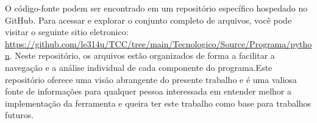 O código-fonte podem ser encontrado em um repositório específico hospedado no GitHub. Para acessar e explorar o conjunto completo de arquivos, você pode visitar o seguinte sitio eletronico: \url{https://github.com/le314u/TCC/tree/main/Tecnologico/Source/Programa/python}. Neste repositório, os arquivos estão organizados de forma a facilitar a navegação e a análise individual de cada componente do programa.Este repositório oferece uma visão abrangente do presente trabalho e é uma valiosa fonte de informações para qualquer pessoa interessada em entender melhor a implementação da ferramenta e queira ter este trabalho como base para trabalhos futuros.


